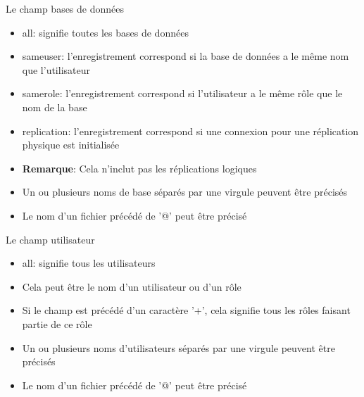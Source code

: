 
\begin{frame}[fragile]{Le champ bases de données}

   \begin{itemize}
      \item all: signifie toutes les bases de données
      \item sameuser: l'enregistrement correspond si la base de données a le même nom que l'utilisateur
      \item samerole: l'enregistrement correspond si l'utilisateur a le même rôle que le nom de la base
      \item replication: l'enregistrement correspond si une connexion pour une réplication physique est initialisée
      \item \textbf{Remarque}: Cela n'inclut pas les réplications logiques
      \item Un ou plusieurs noms de base séparés par une virgule peuvent être précisés
      \item Le nom d'un fichier précédé de '@' peut être précisé
   \end{itemize}

\end{frame}


\begin{frame}[fragile]{Le champ utilisateur}

   \begin{itemize}
      \item all: signifie tous les utilisateurs
      \item Cela peut être le nom d'un utilisateur ou d'un rôle
      \item Si le champ est précédé d'un caractère '+', cela signifie tous les rôles faisant partie de ce rôle
      \item Un ou plusieurs noms d'utilisateurs séparés par une virgule peuvent être précisés
      \item Le nom d'un fichier précédé de '@' peut être précisé
   \end{itemize}

\end{frame}


